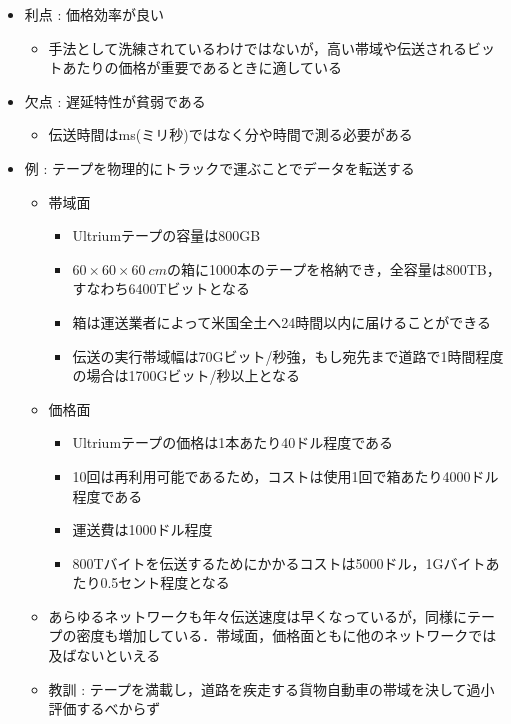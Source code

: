 \documentclass[a4paper]{ltjsarticle}
\begin{document}
			\begin{itemize}
				\item 利点 : 価格効率が良い
				\begin{itemize}
					\item 手法として洗練されているわけではないが，高い帯域や伝送されるビットあたりの価格が重要であるときに適している
				\end{itemize}
				\item 欠点 : 遅延特性が貧弱である
				\begin{itemize}
					\item 伝送時間は\si{ms}(ミリ秒)ではなく分や時間で測る必要がある
				\end{itemize}
				\item 例 : テープを物理的にトラックで運ぶことでデータを転送する
				\begin{itemize}
					\item 帯域面
					\begin{itemize}
						\item Ultriumテープの容量は800GB
						\item $60 \times 60 \times \SI{60}{cm}$の箱に1000本のテープを格納でき，全容量は800TB，すなわち6400Tビットとなる
						\item 箱は運送業者によって米国全土へ24時間以内に届けることができる
						\item 伝送の実行帯域幅は70Gビット/秒強，もし宛先まで道路で1時間程度の場合は1700Gビット/秒以上となる
					\end{itemize}
					\item 価格面
					\begin{itemize}
						\item Ultriumテープの価格は1本あたり40ドル程度である
						\item 10回は再利用可能であるため，コストは使用1回で箱あたり4000ドル程度である
						\item 運送費は1000ドル程度
						\item 800Tバイトを伝送するためにかかるコストは5000ドル，1Gバイトあたり0.5セント程度となる
					\end{itemize}
					\item あらゆるネットワークも年々伝送速度は早くなっているが，同様にテープの密度も増加している．帯域面，価格面ともに他のネットワークでは及ばないといえる
					\item 教訓 : テープを満載し，道路を疾走する貨物自動車の帯域を決して過小評価するべからず
				\end{itemize}
			\end{itemize}
\end{document}
